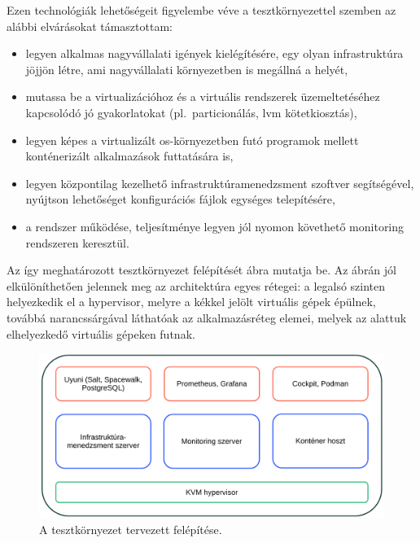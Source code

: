 Ezen technológiák lehetőségeit figyelembe véve a tesztkörnyezettel szemben az alábbi elvárásokat támasztottam:
\begin{itemize}
	\item legyen alkalmas nagyvállalati igények kielégítésére, egy olyan infrastruktúra jöjjön létre, ami nagyvállalati környezetben is megállná a helyét,
	\item mutassa be a virtualizációhoz és a virtuális rendszerek üzemeltetéséhez kapcsolódó jó gyakorlatokat (pl.~particionálás, \acrshort{lvm} kötetkiosztás),
	\item legyen képes a virtualizált \acrshort{os}-környezetben futó programok mellett konténerizált alkalmazások futtatására is,
	\item legyen központilag kezelhető infrastruktúramenedzsment szoftver segítségével, nyújtson lehetőséget konfigurációs fájlok egységes telepítésére,
	\item a rendszer működése, teljesítménye legyen jól nyomon követhető monitoring rendszeren keresztül.
\end{itemize}

Az így meghatározott tesztkörnyezet felépítését  ábra mutatja be. Az ábrán jól elkülöníthetően jelennek meg az architektúra egyes rétegei: a legalsó szinten helyezkedik el a \gls{hypervisor}, melyre a kékkel jelölt virtuális gépek épülnek, továbbá narancssárgával láthatóak az alkalmazásréteg elemei, melyek az alattuk elhelyezkedő virtuális gépeken futnak.

\begin{figure}[!ht]
	\centering
	\includegraphics[width=15cm]{figures/architektura.pdf}
	\caption{A tesztkörnyezet tervezett felépítése.}
	\label{fig:test-env-arch}
\end{figure}

